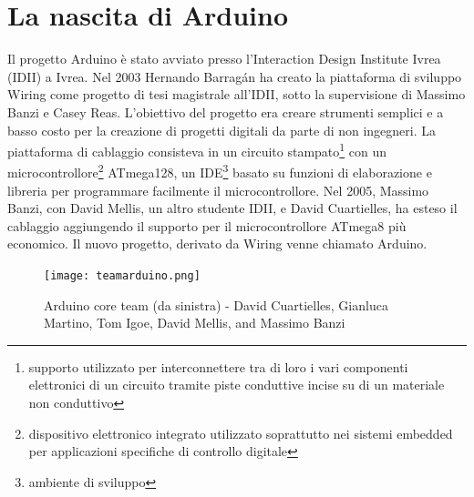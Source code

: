 \documentclass[a4paper,titlepage]{report}
\begin{document}
\section{La nascita di Arduino}
Il progetto Arduino è stato avviato presso l'Interaction Design Institute Ivrea (IDII) a Ivrea. Nel 2003 Hernando Barragán ha creato la piattaforma di sviluppo Wiring come progetto di tesi magistrale all'IDII, sotto la supervisione di Massimo Banzi e Casey Reas. L'obiettivo del progetto era creare strumenti semplici e a basso costo per la creazione di progetti digitali da parte di non ingegneri. La piattaforma di cablaggio consisteva in un circuito stampato\footnote{supporto utilizzato per interconnettere tra di loro i vari componenti elettronici di un circuito tramite piste conduttive incise su di un materiale non conduttivo} con un microcontrollore\footnote{dispositivo elettronico integrato utilizzato soprattutto nei sistemi embedded per applicazioni specifiche di controllo digitale} ATmega128, un IDE\footnote{ambiente di sviluppo} basato su funzioni di elaborazione e libreria per programmare facilmente il microcontrollore. Nel 2005, Massimo Banzi, con David Mellis, un altro studente IDII, e David Cuartielles, ha esteso il cablaggio aggiungendo il supporto per il microcontrollore ATmega8 più economico. Il nuovo progetto, derivato da Wiring venne chiamato Arduino\cite{Kushner:TheMakingOfArduino}.
\begin{figure}[h]
\centering
\texttt{[image: teamarduino.png]}
\caption{Arduino core team (da sinistra) - David Cuartielles, Gianluca Martino, Tom Igoe, David Mellis, and Massimo Banzi}
\end{figure}
\end{document}
